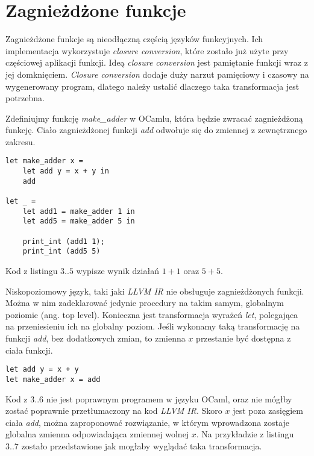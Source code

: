 \documentclass[declaration,shortabstract]{iithesis}
\begin{document}


\section{Zagnieżdżone funkcje}

Zagnieżdżone funkcje są nieodłączną częścią języków funkcyjnych. Ich implementacja wykorzystuje 
\textit{closure conversion}, które zostało już użyte przy częściowej aplikacji funkcji. 
Ideą \textit{closure conversion} jest pamiętanie funkcji wraz z jej domknięciem. 
\textit{Closure conversion} dodaje duży narzut pamięciowy i czasowy na wygenerowany program,
dlatego należy ustalić dlaczego taka transformacja jest potrzebna.

Zdefiniujmy funkcję \textit{make\_adder} w OCamlu, która będzie zwracać zagnieżdżoną funkcję.
Ciało zagnieżdżonej funkcji \textit{add} odwołuje się do zmiennej z zewnętrznego zakresu.

\begin{lstlisting}[frame=single, caption={Zagnieżdżona funkcja w OCamlu}]
let make_adder x = 
    let add y = x + y in 
    add 
  
let _ = 
    let add1 = make_adder 1 in 
    let add5 = make_adder 5 in 
    
    print_int (add1 1);
    print_int (add5 5) 
\end{lstlisting}
Kod z listingu $3..5$ wypisze wynik działań $1 + 1$ oraz $5 + 5$. 

Niskopoziomowy język, taki jaki \textit{LLVM IR} nie obsługuje zagnieżdżonych 
funkcji. Można w
nim zadeklarować jedynie procedury na takim samym, globalnym poziomie (ang. 
top level). 
Konieczna jest transformacja wyrażeń \textit{let}, polegająca na przeniesieniu 
ich na globalny poziom. 
Jeśli wykonamy taką transformację na funkcji \textit{add}, bez dodatkowych 
zmian, to zmienna $x$
przestanie być dostępna z ciała funkcji.

\begin{lstlisting}[frame=single, caption={Przeniesienie funkcji \textit{add} na globalny poziom.}]
let add y = x + y 
let make_adder x = add 
\end{lstlisting}

Kod z $3..6$ nie jest poprawnym programem w języku OCaml, oraz 
nie mógłby zostać poprawnie przetłumaczony na kod \textit{LLVM IR}. 
Skoro $x$ jest poza zasięgiem ciała \textit{add}, można zaproponować rozwiązanie,
w którym wprowadzona zostaje globalna zmienna odpowiadająca zmiennej wolnej $x$. 
Na przykładzie z listingu $3..7$ zostało przedstawione jak mogłaby wyglądać
taka transformacja.
\end{document}
